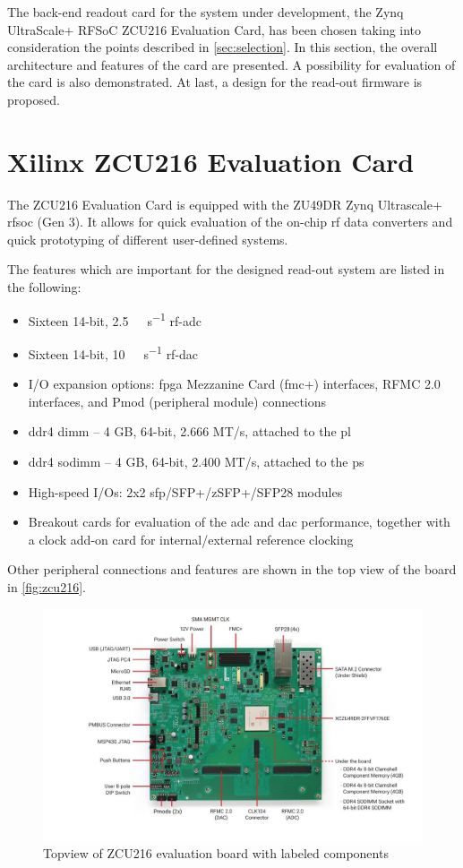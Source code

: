 The back-end readout card for the system under development, the Zynq UltraScale+ RFSoC ZCU216 Evaluation Card, has been chosen taking into consideration the points described in \autoref{sec:selection}.
In this section, the overall architecture and features of the card are presented.
A possibility for evaluation of the card is also demonstrated.
At last, a design for the read-out firmware is proposed. 

\section{Xilinx ZCU216 Evaluation Card}
The ZCU216 Evaluation Card is equipped with the ZU49DR Zynq Ultrascale+ \gls{rfsoc} (Gen 3). 
It allows for quick evaluation of the on-chip \gls{rf} data converters and quick prototyping of different user-defined systems.

The features which are important for the designed read-out system are listed in the following:
\begin{itemize}[noitemsep]
	\item Sixteen 14-bit, \SI{2.5}{\giga \sample \per \second} \gls{rf}-\gls{adc}
	\item Sixteen 14-bit, \SI{10}{\giga \sample \per \second} \gls{rf}-\gls{dac}
	\item I/O expansion options: \gls{fpga} Mezzanine Card (\gls{fmc}+) interfaces, RFMC 2.0 interfaces, and Pmod (peripheral module) connections
	\item \gls{ddr4} \gls{dimm} -- 4 GB, 64-bit, 2.666 MT/s, attached to the \gls{pl}
	\item \gls{ddr4} \gls{sodimm} -- 4 GB, 64-bit, 2.400 MT/s, attached to the \gls{ps}
	\item High-speed I/Os: 2x2 \gls{sfp}/SFP+/zSFP+/SFP28 modules
	\item Breakout cards for evaluation of the \gls{adc} and \gls{dac} performance, together with a clock add-on card for internal/external reference clocking
\end{itemize}
Other peripheral connections and features are shown in the top view of the board in \autoref{fig:zcu216}.

\begin{figure}[tbh]
	\centering
	\includegraphics[width = \textwidth]{chap/05-readout/img/zcu216}
	\caption{Topview of ZCU216 evaluation board with labeled components}
	\label{fig:zcu216}
\end{figure}

